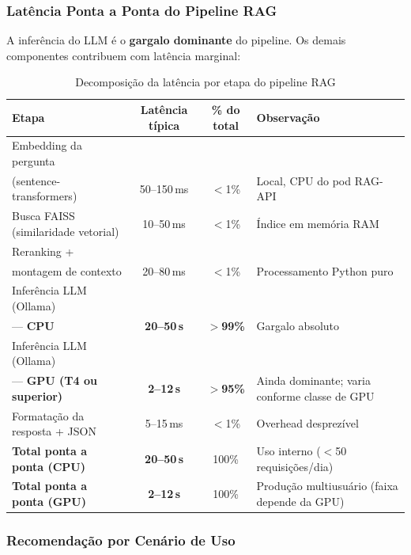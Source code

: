 \documentclass[12pt, a4paper]{article}
\begin{document}
\subsubsection*{Latência Ponta a Ponta do Pipeline RAG}

A inferência do LLM é o \textbf{gargalo dominante} do pipeline. Os demais componentes contribuem com latência marginal:

\begin{table}[H]
\centering
\small
\caption{Decomposição da latência por etapa do pipeline RAG}
\label{tab:latencia_pipeline}
\begin{tabularx}{\textwidth}{l c c X}
\toprule
\textbf{Etapa} & \textbf{Latência típica} & \textbf{\% do total} & \textbf{Observação} \\
\midrule
Embedding da pergunta\\ (sentence-transformers) & 50--150\,ms & $<$1\% & Local, CPU do pod RAG-API \\
Busca FAISS (similaridade vetorial) & 10--50\,ms & $<$1\% & Índice em memória RAM \\
Reranking + \\montagem de contexto & 20--80\,ms & $<$1\% & Processamento Python puro \\
Inferência LLM (Ollama) \\--- \textbf{CPU} & \textbf{20--50\,s} & \textbf{$>$99\%} & Gargalo absoluto \\
Inferência LLM (Ollama) \\--- \textbf{GPU (T4 ou superior)} & \textbf{2--12\,s} & \textbf{$>$95\%} & Ainda dominante; varia conforme classe de GPU \\
Formatação da resposta + JSON & 5--15\,ms & $<$1\% & Overhead desprezível \\
\midrule
\textbf{Total ponta a ponta (CPU)} & \textbf{20--50\,s} & 100\% & Uso interno ($<$50 requisições/dia) \\
\textbf{Total ponta a ponta (GPU)} & \textbf{2--12\,s} & 100\% & Produção multiusuário (faixa depende da GPU) \\
\bottomrule
\end{tabularx}
\end{table}

\subsubsection*{Recomendação por Cenário de Uso}
\end{document}
